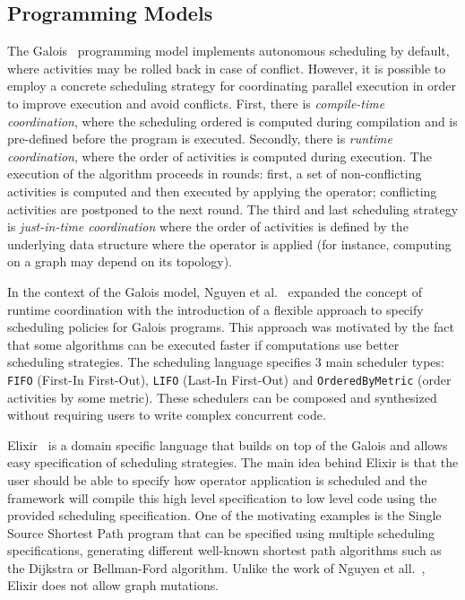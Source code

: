 \subsection{Programming Models}

The Galois~\cite{Pingali:2011:TPA:1993316.1993501} programming model implements
autonomous scheduling by default, where activities may be rolled back in case of
conflict. However, it is possible to employ a concrete scheduling strategy for
coordinating parallel execution in order to improve execution and avoid
conflicts.  First, there is \emph{compile-time coordination}, where the
scheduling ordered is computed during compilation and is pre-defined before the
program is executed. Secondly, there is \emph{runtime coordination}, where the
order of activities is computed during execution. The execution of the algorithm
proceeds in rounds: first, a set of non-conflicting activities is computed and
then executed by applying the operator; conflicting activities are postponed to
the next round. The third and last scheduling strategy is \emph{just-in-time
coordination} where the order of activities is defined by the underlying data
structure where the operator is applied (for instance, computing on a graph
may depend on its topology).

In the context of the Galois model, Nguyen et al.~\cite{nguyen11} expanded the
concept of runtime coordination with the introduction of a flexible approach to specify
scheduling policies for Galois programs. This approach was motivated by the fact
that some algorithms can be executed faster if computations use better
scheduling strategies. The scheduling language specifies 3 main scheduler types:
\texttt{FIFO} (First-In First-Out), \texttt{LIFO} (Last-In First-Out) and
\texttt{OrderedByMetric} (order activities by some metric). These schedulers can
be composed and synthesized without requiring users to write complex concurrent
code.

Elixir~\cite{Prountzos:2012:ESS:2384616.2384644} is a domain specific language
that builds on top of the Galois and allows easy specification of scheduling
strategies.  The main idea behind Elixir is that the user should be able to
specify how operator application is scheduled and the framework will compile
this high level specification to low level code using the provided scheduling
specification. One of the motivating examples is the Single Source Shortest Path
program that can be specified using multiple scheduling specifications,
generating different well-known shortest path algorithms such as the
Dijkstra or Bellman-Ford algorithm. Unlike the work of Nguyen et
all.~\cite{nguyen11}, Elixir does not allow graph mutations.

